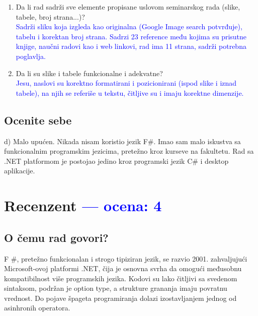 \documentclass[a4paper]{report}
\newcommand{\odgovor}[1]{\textcolor{blue}{#1}}
\begin{document}
\begin{enumerate}
\item Da li rad sadrži sve elemente propisane uslovom seminarskog rada (slike, tabele, broj strana...)?\\
\odgovor{
Sadrži sliku koja izgleda kao originalna (Google Image search potvrđuje), tabelu i korektan broj strana. Sadrzi 23 reference među kojima su prisutne knjige, naučni radovi kao i web linkovi, rad ima 11 strana, sadrži potrebna poglavlja.
}

\item Da li su slike i tabele funkcionalne i adekvatne?\\
\odgovor{
Jesu, naslovi su korektno formatirani i pozicionirani (ispod slike i iznad tabele), na njih se referiše u tekstu, čitljive su i imaju korektne dimenzije.
}

\end{enumerate}

\section{Ocenite sebe}
d) Malo upućen. Nikada nisam koristio jezik F\#. Imao sam malo iskustva sa funkcionalnim programskim jezicima, pretežno kroz kurseve na fakultetu. Rad sa .NET platformom je postojao jedino kroz programski jezik C\# i desktop aplikacije.


\chapter{Recenzent \odgovor{--- ocena: 4} }


\section{O čemu rad govori?}
F \#, pretežno funkcionalan i strogo tipiziran jezik, se razvio 2001. zahvaljujući Microsoft-ovoj platformi .NET, čija je osnovna svrha da omogući međusobnu kompatibilnost više programskih jezika. Kodovi su lako čitljivi sa svedenom sintaksom, podržan je option type, a strukture grananja imaju povratnu vrednost. Do pojave špageta programiranja dolazi izostavljanjem jednog od asinhronih operatora.
\end{document}

